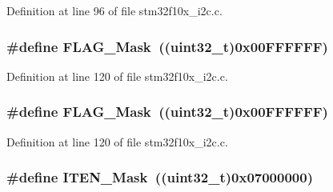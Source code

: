 Definition at line 96 of file stm32f10x\+\_\+i2c.\+c.

\subsubsection[{\texorpdfstring{F\+L\+A\+G\+\_\+\+Mask}{FLAG_Mask}}]{\setlength{\rightskip}{0pt plus 5cm}\#define F\+L\+A\+G\+\_\+\+Mask~(({\bf uint32\+\_\+t})0x00\+F\+F\+F\+F\+F\+F)}\hypertarget{group___i2_c___private___defines_ga2be62bf481cd44de9ab604efe5595ff6}{}\label{group___i2_c___private___defines_ga2be62bf481cd44de9ab604efe5595ff6}


Definition at line 120 of file stm32f10x\+\_\+i2c.\+c.

\subsubsection[{\texorpdfstring{F\+L\+A\+G\+\_\+\+Mask}{FLAG_Mask}}]{\setlength{\rightskip}{0pt plus 5cm}\#define F\+L\+A\+G\+\_\+\+Mask~(({\bf uint32\+\_\+t})0x00\+F\+F\+F\+F\+F\+F)}\hypertarget{group___i2_c___private___defines_ga2be62bf481cd44de9ab604efe5595ff6}{}\label{group___i2_c___private___defines_ga2be62bf481cd44de9ab604efe5595ff6}


Definition at line 120 of file stm32f10x\+\_\+i2c.\+c.

\subsubsection[{\texorpdfstring{I\+T\+E\+N\+\_\+\+Mask}{ITEN_Mask}}]{\setlength{\rightskip}{0pt plus 5cm}\#define I\+T\+E\+N\+\_\+\+Mask~(({\bf uint32\+\_\+t})0x07000000)}\hypertarget{group___i2_c___private___defines_gab99e12994e073c2a681a6cf68492b3e2}{}\label{group___i2_c___private___defines_gab99e12994e073c2a681a6cf68492b3e2}


